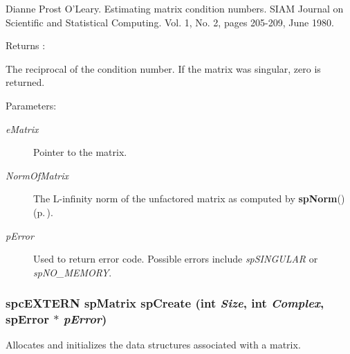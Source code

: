 Dianne Prost O'Leary. Estimating matrix condition numbers. SIAM Journal on Scientific and Statistical Computing. Vol. 1, No. 2, pages 205-209, June 1980.

\begin{Desc}
\item[Returns :]\par
 The reciprocal of the condition number. If the matrix was singular, zero is returned.\end{Desc}
\begin{Desc}
\item[Parameters: ]\par
\begin{description}
\item[{\em 
e\-Matrix}]Pointer to the matrix. \item[{\em 
Norm\-Of\-Matrix}]The L-infinity norm of the unfactored matrix as computed by {\bf sp\-Norm}() {\rm (p.\,\pageref{spMatrix_8h_a45})}. \item[{\em 
p\-Error}]Used to return error code. Possible errors include {\em sp\-SINGULAR} or {\em sp\-NO\_\-MEMORY}. \end{description}
\end{Desc}
\subsubsection{\setlength{\rightskip}{0pt plus 5cm}spc\-EXTERN {\bf sp\-Matrix} sp\-Create (int {\em Size}, int {\em Complex}, {\bf sp\-Error} $\ast$ {\em p\-Error})}\label{spMatrix_8h_a24}


Allocates and initializes the data structures associated with a matrix.

